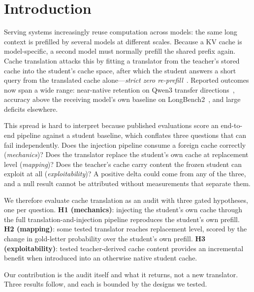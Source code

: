 \documentclass[10pt]{article}
\newcommand{\kv}{\ensuremath{\mathrm{KV}}}
\begin{document}

\section{Introduction}
\label{sec:intro}

Serving systems increasingly reuse computation across models: the same long
context is prefilled by several models at different scales. Because a \kv{}
cache is model-specific, a second model must normally prefill the shared prefix
again. Cache translation attacks this by fitting a translator from the teacher's
stored cache into the student's cache space, after which the student answers a short
query from the translated cache alone---\emph{strict zero
re-prefill}~\citep{c2c2025,lsc2026,mot2026,heo2026,cachebridge2026,contextreuse2026}.
Reported outcomes now span a wide range: near-native retention on Qwen3
transfer directions~\citep{cachebridge2026}, accuracy above the receiving
model's own baseline on LongBench2~\citep{contextreuse2026}, and large deficits
elsewhere.

This spread is hard to interpret because published evaluations score an
end-to-end pipeline against a student baseline, which conflates three questions
that can fail independently. Does the injection pipeline consume a foreign
cache correctly (\emph{mechanics})? Does the translator replace the student's own cache
at replacement level (\emph{mapping})? Does the teacher's cache carry content
the frozen student can exploit at all (\emph{exploitability})? A positive delta
could come from any of the three, and a null result cannot be attributed
without measurements that separate them.

We therefore evaluate cache translation as an audit with three gated
hypotheses, one per question.
\textbf{H1 (mechanics)}: injecting the student's own cache through the full
translation-and-injection pipeline reproduces the student's own prefill.
\textbf{H2 (mapping)}: some tested translator reaches replacement level, scored
by the change in gold-letter probability over the student's own prefill.
\textbf{H3 (exploitability)}: tested teacher-derived cache content provides an
incremental benefit when introduced into an otherwise native student cache.

Our contribution is the audit itself and what it returns, not a new translator.
Three results follow, and each is bounded by the designs we tested.
\end{document}
